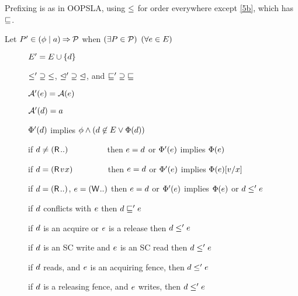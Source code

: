 Prefixing is as in OOPSLA, using $\le$ for order everywhere except
\ref{5b}, which has $\sqsubseteq$.
\begin{definition}
  Let $P'\in(\phi \mid a) \mathbin\Rightarrow \mathcal{P}$ when
  $(\exists P\in\mathcal{P})$ $(\forall e\in E)$
  \begin{description}
  \item[{}] $E' = E \cup \{d\}$
  \item[{}] ${\le'}\supseteq{\le}$,
    ${\trianglelefteq'}\supseteq{\trianglelefteq}$, and ${\sqsubseteq'}\supseteq{\sqsubseteq}$
  \item[{}]%
    $\mathcal{A}'(e) = \mathcal{A}(e)$
  \item[{}] $\mathcal{A}'(d) = a$
  \item[{}]%
    $\Phi'(d)$ implies
    $\phi\land(d\not\in E\lor\Phi(d))$
  \item[{}] if $\bEv\neq(\DR[]{..)}{}\mkern79mu$
    then $e=d$ or $\Phi'(e)$ implies $\Phi(e)$
  \item[{}] if
    $\bEv=(\DR[]{\aVal}{\aLoc})\mkern70mu$ then $e=d$ or
    $\Phi'(e)$ implies $\Phi(e)[v/x]$
  \item[{}]%
    if $\bEv=(\DR[]{..)}{}$, $\aEv=(\DW[]{..)}{}$ then $e=d$ or
    $\Phi'(e)$ implies $\Phi(e)$ or $d\le'e$
  \item[{}] if $d$ conflicts with
    $e$ %
    then $d\sqsubseteq'e$
  \item[{}] if $d$ is an acquire or $e$ is
    a release then $d \le' e$
  \item[{}] if $d$ is an SC write and $e$
    is an SC read then $d \le' e$
  \item[{}] if $d$ reads, and $e$ is an
    acquiring fence, then
    $d \le' e$
  \item[{}] if $d$ is a releasing fence,
    and $e$ writes, then
    $d \le' e$
  \end{description}
\end{definition}

